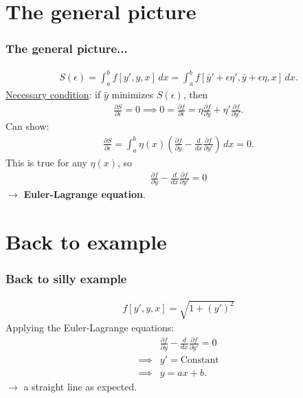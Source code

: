 \documentclass{beamer}
\theoremstyle{definition}
\newcommand{\p}{\partial}
\begin{document}

\section{The general picture}

\begin{frame}
\frametitle{The general picture...}
\pause
\begin{align*}
S(\epsilon) = \int^{b}_a f[y',y,x]\,dx = \int^b_a f[\bar{y}'+\epsilon\eta',\bar{y}+\epsilon\eta,x]\,dx.
\end{align*}
\pause
\underline{Necessary condition}: if $\bar{y}$ minimizes $S(\epsilon)$, then \pause
\begin{align*}
\frac{\p S}{\p \epsilon} = 0 \implies 0 = \frac{\p f}{\p \epsilon} = \eta \frac{\p f}{\p y} + \eta'\frac{\p f}{\p y'}.
\end{align*}
\pause Can show: \pause
\begin{align*}
\frac{\p S}{\p \epsilon} = \int^b_a \eta(x)\left( \frac{\p f}{\p y} - \frac{d}{dx}\frac{\p f}{\p y'}\right)\,dx = 0.
\end{align*}
\pause This is true for any $\eta(x)$, so \pause 
\begin{align*}
\boxed{\frac{\p f}{\p y} - \frac{d}{dx}\frac{\p f}{\p y'} = 0}
\end{align*}
$\longrightarrow$ \textbf{Euler-Lagrange equation}.
\end{frame}




\section{Back to example}


\begin{frame}
\frametitle{Back to silly example}
\pause
\begin{align*}
f[y',y,x] = \sqrt{1 +(y')^2}
\end{align*}
\pause
Applying the Euler-Lagrange equations: \pause
\begin{align*}
&\frac{\p f}{\p y} - \frac{d}{dx}\frac{\p f}{\p y'} = 0\\
\implies& y' = \text{Constant}\\
\implies& y = ax + b.
\end{align*}
$\longrightarrow$ a straight line as expected. 
\end{frame}
\end{document}
